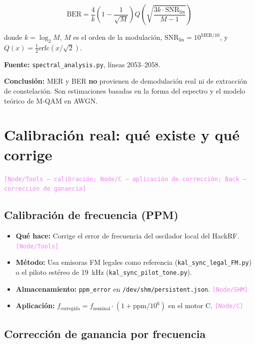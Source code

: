 \documentclass[11pt,a4paper]{article}
\newcommand{\where}[1]{\textcolor{violet}{\texttt{[#1]}}}
\begin{document}
\begin{equation}
\boxed{
\text{BER} = \frac{4}{k}\left(1 - \frac{1}{\sqrt{M}}\right) Q\!\left(\sqrt{\frac{3k \cdot \text{SNR}_{\text{lin}}}{M - 1}}\right)
}
\label{eq:ber}
\end{equation}

donde $k = \log_2 M$, $M$ es el orden de la modulación, $\text{SNR}_{\text{lin}} = 10^{\text{MER}/10}$, y $Q(x) = \frac{1}{2}\text{erfc}(x/\sqrt{2})$.

\textbf{Fuente:} \texttt{spectral\_analysis.py}, líneas 2053--2058.

\textbf{Conclusión:} MER y BER \textbf{no} provienen de demodulación real ni de extracción de constelación. Son estimaciones basadas en la forma del espectro y el modelo teórico de M-QAM en AWGN.

\section{Calibración real: qué existe y qué corrige}
\label{sec:calibration}

\where{Node/Tools — calibración; Node/C — aplicación de corrección; Back — corrección de ganancia}

\subsection{Calibración de frecuencia (PPM)}

\begin{itemize}
\item \textbf{Qué hace:} Corrige el error de frecuencia del oscilador local del HackRF. \where{Node/Tools}
\item \textbf{Método:} Usa emisoras FM legales como referencia (\texttt{kal\_sync\_legal\_FM.py}) o el piloto estéreo de 19~kHz (\texttt{kal\_sync\_pilot\_tone.py}).
\item \textbf{Almacenamiento:} \texttt{ppm\_error} en \texttt{/dev/shm/persistent.json}. \where{Node/SHM}
\item \textbf{Aplicación:} $f_{\text{corregida}} = f_{\text{nominal}} \cdot (1 + \text{ppm}/10^6)$ en el motor C. \where{Node/C}
\end{itemize}

\subsection{Corrección de ganancia por frecuencia}
\end{document}
